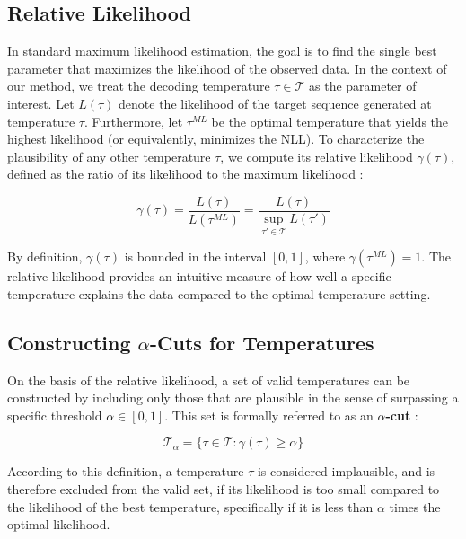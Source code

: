 \subsection{Relative Likelihood}
\label{sec:background:rel_ll_and_temp_sets:relative_likelihood}
In standard maximum likelihood estimation, the goal is to find
the single best parameter that maximizes the likelihood of the
observed data. In the context of our method, we treat the decoding 
temperature $\tau \in \mathcal{T}$ as the parameter of interest.
Let $L(\tau)$ denote the likelihood of the target sequence generated 
at temperature $\tau$. Furthermore, let $\tau^{ML}$ be the optimal
temperature that yields the highest likelihood (or equivalently,
minimizes the NLL).
To characterize the plausibility of any other temperature $\tau$, we
compute its relative likelihood $\gamma(\tau)$, defined as the 
ratio of its likelihood to the maximum likelihood
\parencite{largesampledistribution, Birnbaum01061962, https://doi.org/10.2307/3315449, https://doi.org/10.1111/1467-9868.00205}:

\begin{equation}
    \gamma(\tau) = 
    \frac{L(\tau)}{L(\tau^{ML})} = 
    \frac{L(\tau)}{\sup_{\tau' \in \mathcal{T}} L(\tau')}
    \label{eq:relative_likelihood}
\end{equation}

By definition, $\gamma(\tau)$ is bounded in the interval $[0,1]$, 
where $\gamma(\tau^{ML}) = 1$. The relative likelihood provides
an intuitive measure of how well a specific temperature explains
the data compared to the optimal temperature setting.

\subsection{Constructing $\alpha$-Cuts for Temperatures}
\label{sec:background:rel_ll_and_temp_sets:alpha_cuts}
On the basis of the relative likelihood, a set of valid temperatures
can be constructed by including only those that are plausible in the  
sense of surpassing a specific threshold $\alpha \in [0,1]$. This 
set is formally referred to as an \textbf{$\alpha$-cut}
\parencite{epub31329}:

\begin{equation}
    \mathcal{T}_\alpha = 
    \{\tau \in \mathcal{T} : \gamma(\tau) \geq \alpha \}
    \label{eq:alpha_cut}
\end{equation}

According to this definition, a temperature $\tau$ is considered
implausible, and is therefore excluded from the valid set, if 
its likelihood is too small compared to the likelihood of the 
best temperature, specifically if it is less than $\alpha$
times the optimal likelihood.
